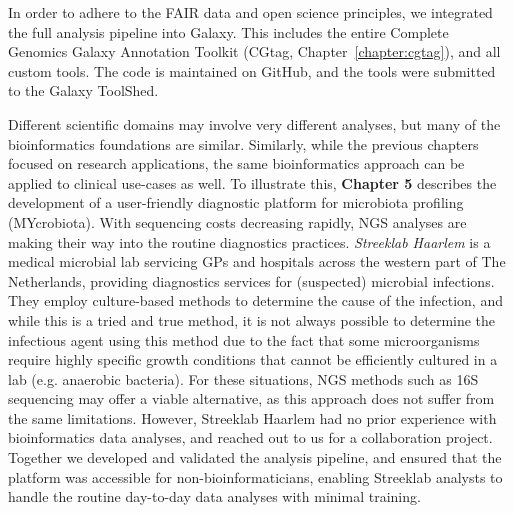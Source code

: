\begin{justify}
In order to adhere to the FAIR data and open science principles, we integrated the full analysis pipeline into Galaxy. This includes the entire Complete Genomics Galaxy Annotation Toolkit (CGtag, Chapter~\ref{chapter:cgtag}), and all custom tools. The code is maintained on GitHub, and the tools were submitted to the Galaxy ToolShed.

Different scientific domains may involve very different analyses, but many of the bioinformatics foundations are similar. Similarly, while the previous chapters focused on research applications, the same bioinformatics approach can be applied to clinical use-cases as well. To illustrate this, \textbf{Chapter 5} describes the development of a user-friendly diagnostic platform for microbiota profiling (MYcrobiota). With sequencing costs decreasing rapidly, NGS analyses are making their way into the routine diagnostics practices. \emph{Streeklab Haarlem} is a medical microbial lab servicing GPs and hospitals across the western part of The Netherlands, providing diagnostics services for (suspected) microbial infections. They employ culture-based methods to determine the cause of the infection, and while this is a tried and true method, it is not always possible to determine the infectious agent using this method due to the fact that some microorganisms require highly specific growth conditions that cannot be efficiently cultured in a lab (e.g. anaerobic bacteria). For these situations, NGS methods such as 16S sequencing may offer a viable alternative, as this approach does not suffer from the same limitations. However, Streeklab Haarlem had no prior experience with bioinformatics data analyses, and reached out to us for a collaboration project. Together we developed and validated the analysis pipeline, and ensured that the platform was accessible for non-bioinformaticians, enabling Streeklab analysts to handle the routine day-to-day data analyses with minimal training.


\end{justify}
